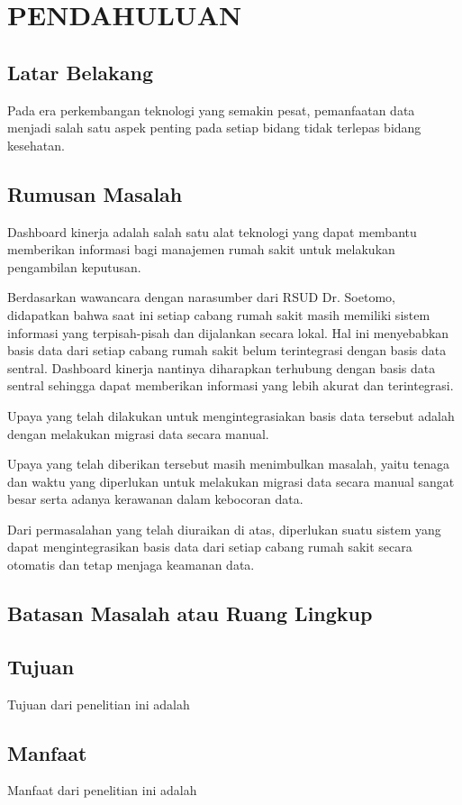 \chapter{PENDAHULUAN}

\section{Latar Belakang}


Pada era perkembangan teknologi yang semakin pesat, pemanfaatan data menjadi salah satu aspek penting pada setiap bidang tidak terlepas bidang kesehatan.


\section{Rumusan Masalah}

Dashboard kinerja adalah salah satu alat teknologi yang dapat membantu memberikan informasi bagi manajemen rumah sakit untuk
melakukan pengambilan keputusan.

Berdasarkan wawancara dengan narasumber dari RSUD Dr. Soetomo, didapatkan bahwa saat ini setiap cabang rumah sakit masih memiliki 
sistem informasi yang terpisah-pisah dan dijalankan secara lokal. Hal ini menyebabkan basis data dari setiap cabang rumah sakit belum terintegrasi dengan basis data sentral. 
Dashboard kinerja nantinya diharapkan terhubung dengan basis data sentral sehingga dapat memberikan informasi yang lebih akurat dan terintegrasi.

Upaya yang telah dilakukan untuk mengintegrasiakan basis data tersebut adalah dengan melakukan migrasi data secara manual.

Upaya yang telah diberikan tersebut masih menimbulkan masalah, yaitu tenaga dan waktu yang diperlukan untuk melakukan migrasi data secara manual sangat besar serta adanya kerawanan dalam kebocoran data.

Dari permasalahan yang telah diuraikan di atas, diperlukan suatu sistem yang dapat mengintegrasikan basis data dari setiap cabang rumah sakit secara otomatis dan tetap menjaga keamanan data.

\section{Batasan Masalah atau Ruang Lingkup}

\lipsum[6]

\section{Tujuan}

Tujuan dari penelitian ini adalah \lipsum[7][1-14]

\section{Manfaat}

Manfaat dari penelitian ini adalah \lipsum[8][1-14]
